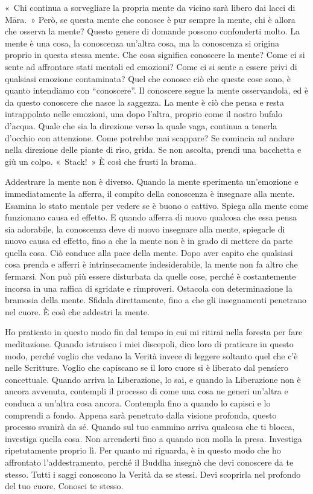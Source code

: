 «~Chi continua a sorvegliare la propria mente da vicino sarà libero dai
lacci di Māra.~» Però, se questa mente che conosce è pur sempre la
mente, chi è allora che osserva la mente? Questo genere di domande
possono confonderti molto. La mente è una cosa, la conoscenza un'altra
cosa, ma la conoscenza si origina proprio in questa stessa mente. Che
cosa significa conoscere la mente? Come ci si sente ad affrontare stati
mentali ed emozioni? Come ci si sente a essere privi di qualsiasi
emozione contaminata? Quel che conosce ciò che queste cose sono, è
quanto intendiamo con ``conoscere''. Il conoscere segue la mente
osservandola, ed è da questo conoscere che nasce la saggezza. La mente è
ciò che pensa e resta intrappolato nelle emozioni, una dopo l'altra,
proprio come il nostro bufalo d'acqua. Quale che sia la direzione verso
la quale vaga, continua a tenerla d'occhio con attenzione. Come potrebbe
mai scappare? Se comincia ad andare nella direzione delle piante di
riso, grida. Se non ascolta, prendi una bacchetta e giù un colpo.
«~Stack!~» È così che frusti la brama.

Addestrare la mente non è diverso. Quando la mente sperimenta
un'emozione e immediatamente la afferra, il compito della conoscenza è
insegnare alla mente. Esamina lo stato mentale per vedere se è buono o
cattivo. Spiega alla mente come funzionano causa ed effetto. E quando
afferra di nuovo qualcosa che essa pensa sia adorabile, la conoscenza
deve di nuovo insegnare alla mente, spiegarle di nuovo causa ed effetto,
fino a che la mente non è in grado di mettere da parte quella cosa. Ciò
conduce alla pace della mente. Dopo aver capito che qualsiasi cosa
prenda e afferri è intrinsecamente indesiderabile, la mente non fa altro
che fermarsi. Non può più essere disturbata da quelle cose, perché è
costantemente incorsa in una raffica di sgridate e rimproveri. Ostacola
con determinazione la bramosia della mente. Sfidala direttamente, fino a
che gli insegnamenti penetrano nel cuore. È così che addestri la mente.

Ho praticato in questo modo fin dal tempo in cui mi ritirai nella
foresta per fare meditazione. Quando istruisco i miei discepoli, dico
loro di praticare in questo modo, perché voglio che vedano la Verità
invece di leggere soltanto quel che c'è nelle Scritture. Voglio che
capiscano se il loro cuore si è liberato dal pensiero concettuale.
Quando arriva la Liberazione, lo sai, e quando la Liberazione non è
ancora avvenuta, contempli il processo di come una cosa ne generi
un'altra e conduca a un'altra cosa ancora. Contempla fino a quando lo
capisci e lo comprendi a fondo. Appena sarà penetrato dalla visione
profonda, questo processo svanirà da sé. Quando sul tuo cammino arriva
qualcosa che ti blocca, investiga quella cosa. Non arrenderti fino a
quando non molla la presa. Investiga ripetutamente proprio lì. Per
quanto mi riguarda, è in questo modo che ho affrontato l'addestramento,
perché il Buddha insegnò che devi conoscere da te stesso. Tutti i saggi
conoscono la Verità da se stessi. Devi scoprirla nel profondo del tuo
cuore. Conosci te stesso.

